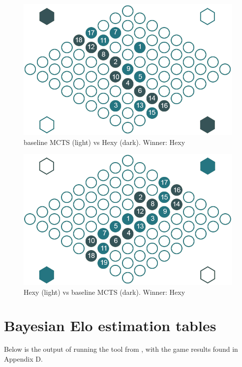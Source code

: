 \begin{figure}[ht]
	\centering
	\includegraphics[width=.75\textwidth]{graphics/games/mcts-hexy.png}
	\caption{baseline MCTS (light) vs Hexy (dark). Winner: Hexy}
	\label{fig-mcts-hexy}
\end{figure}
\vspace{1cm}
\begin{figure}[ht]
	\centering
	\includegraphics[width=.75\textwidth]{graphics/games/hexy-mcts.png}
	\caption{Hexy (light) vs baseline MCTS (dark). Winner: Hexy}
	\label{fig-hexy-mcts}
\end{figure}


\clearpage
\section{Bayesian Elo estimation tables}
Below is the output of running the tool \cite{Coulom} from \citeauthor{Coulom}, with the game results found in Appendix D.


